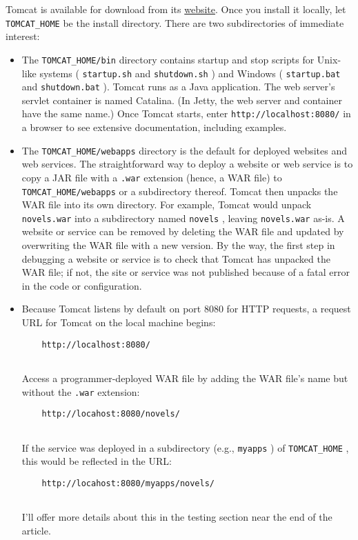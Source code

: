 \documentclass[12pt]{article}
\begin{document}
Tomcat is available for download from its \href{https://tomcat.apache.org/download-90.cgi}{website}. Once you install it locally, let \verb|TOMCAT_HOME| be the install directory. There are two subdirectories of immediate interest:

\begin{itemize}
    \item The \verb|TOMCAT_HOME/bin| directory contains startup and stop scripts for Unix-like systems ( \verb|startup.sh| and \verb|shutdown.sh| ) and Windows ( \verb|startup.bat| and \verb|shutdown.bat| ). Tomcat runs as a Java application. The web server's servlet container is named Catalina. (In Jetty, the web server and container have the same name.) Once Tomcat starts, enter \verb|http://localhost:8080/| in a browser to see extensive documentation, including examples.
    \item The \verb|TOMCAT_HOME/webapps| directory is the default for deployed websites and web services. The straightforward way to deploy a website or web service is to copy a JAR file with a \verb|.war| extension (hence, a WAR file) to \verb|TOMCAT_HOME/webapps| or a subdirectory thereof. Tomcat then unpacks the WAR file into its own directory. For example, Tomcat would unpack \verb|novels.war| into a subdirectory named \verb|novels| , leaving \verb|novels.war| as-is. A website or service can be removed by deleting the WAR file and updated by overwriting the WAR file with a new version. By the way, the first step in debugging a website or service is to check that Tomcat has unpacked the WAR file; if not, the site or service was not published because of a fatal error in the code or configuration.
    \item Because Tomcat listens by default on port 8080 for HTTP requests, a request URL for Tomcat on the local machine begins:\\
    \begin{lstlisting}
    http://localhost:8080/
    
    \end{lstlisting}
    Access a programmer-deployed WAR file by adding the WAR file's name but without the \verb|.war| extension:\\
    \begin{lstlisting}
    http://locahost:8080/novels/
    
    \end{lstlisting}
    If the service was deployed in a subdirectory (e.g., \verb|myapps| ) of \verb|TOMCAT_HOME| , this would be reflected in the URL:\\
    \begin{lstlisting}
    http://locahost:8080/myapps/novels/
    
    \end{lstlisting}
    I'll offer more details about this in the testing section near the end of the article.
\end{itemize}
\end{document}
